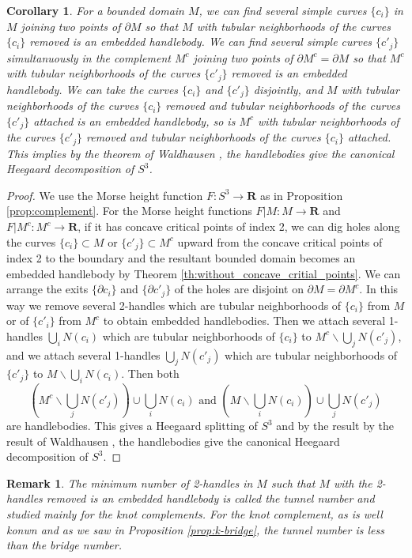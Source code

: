 \documentclass{amsart}
\newtheorem{corollary}[theorem]{Corollary}
\newtheorem{remark}[theorem]{Remark}
\numberwithin{equation}{section}
\newcommand{\RR}{{\boldsymbol{R}}}
\newcommand{\lra}{\longrightarrow}
\newcommand{\DS}{\displaystyle}
\newcommand{\bd}{\partial}
\newcommand{\ssm}{\smallsetminus}
\begin{document}
\begin{corollary}
For a bounded domain $M$, we can find several simple curves $\{c_i\}$ in $M$ joining two points of $\bd M$ so that $M$ with tubular neighborhoods of the curves $\{c_i\}$ removed is an embedded handlebody.
We can find several simple curves $\{c'_j\}$ simultanuously in the complement $M^c$ joining two points of $\bd M^c=\bd M$ 
so that $M^c$ with tubular neighborhoods of the curves $\{c'_j\}$ removed is an embedded handlebody. 
We can take the curves $\{c_i\}$ and $\{c'_j\}$ disjointly, and 
$M$ with tubular neighborhoods of the curves $\{c_i\}$ removed and
 tubular neighborhoods of the curves $\{c'_j\}$ attached is an embedded handlebody, so is $M^c$ with tubular neighborhoods of the curves $\{c'_j\}$ removed and  tubular neighborhoods of the curves $\{c_i\}$ attached.
This implies by the theorem of Waldhausen \cite{Waldhausen}, the handlebodies give the canonical Heegaard decomposition of $S^3$.
\end{corollary}
 
\begin{proof}
We use the Morse height function  $F:S^3\lra \RR$ as in Proposition \ref{prop:complement}. For the Morse height functions $F|M:M\lra \RR$ and $F|M^c:M^c\lra \RR$, if it has concave critical points of index 2, we can dig holes along the curves $\{c_i\}\subset M$ or $\{c'_j\}\subset M^c$ upward from the concave critical points of index 2 to the boundary and the resultant bounded domain becomes an embedded handlebody by Theorem \ref{th:without_concave_critial_points}. We can arrange the exits $\{\bd c_i\}$ and $\{\bd c'_j\}$ of the holes are disjoint on $\bd M=\bd M^c$. In this way we remove several 2-handles which are tubular neighborhoods of $\{c_i\}$  from $M$ or of $\{c'_i\}$  from $M^c$ to obtain embedded handlebodies. Then we attach several 1-handles $\DS\bigcup_i N(c_i)$ which are tubular neighborhoods of $\{c_i\}$ to $\DS M^c\ssm \bigcup_j N(c'_j)$, and 
we attach several 1-handles $\DS \bigcup_j N(c'_j)$ which are tubular neighborhoods of $\{c'_j\}$ to $\DS M\ssm \bigcup_i N(c_i)$. Then both 
$$\text{$\DS (M^c\ssm \bigcup_j N(c'_j))\cup \DS\bigcup_i N(c_i)$ and 
$\DS (M\ssm \bigcup_i N(c_i))\cup \DS\bigcup_j N(c'_j)$}$$ are handlebodies.
This gives a Heegaard splitting of $S^3$ and by the result by 
the result of Waldhausen \cite{Waldhausen}, the handlebodies give the canonical Heegaard decomposition of $S^3$.
\end{proof}

\begin{remark}
The minimum number of 2-handles in $M$ such that $M$ with the 2-handles removed is an embedded handlebody is called the tunnel number and studied mainly for the knot complements. For the knot complement, as is well konwn and as we saw in Proposition \ref{prop:k-bridge}, the tunnel number is less than the bridge number.
\end{remark}
\end{document}
